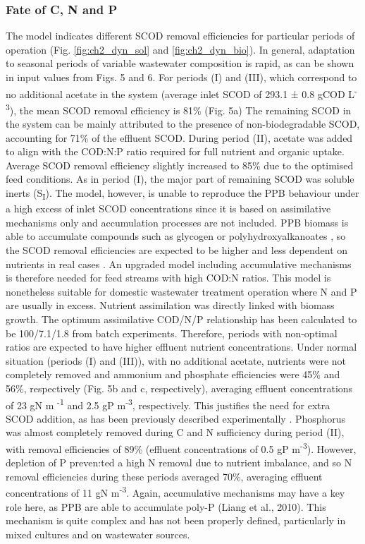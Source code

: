 \subsubsection{Fate of C, N and P}
The model indicates different SCOD removal efficiencies for particular periods of operation (Fig. \ref{fig:ch2_dyn_sol} and \ref{fig:ch2_dyn_bio}). In general, adaptation to seasonal periods of variable wastewater composition is rapid, as can be shown in input values from Figs. 5 and 6. For periods (I) and (III), which correspond to no additional acetate in the system (average inlet SCOD of 293.1 ± 0.8 gCOD L\textsuperscript{-3}), the mean SCOD removal efficiency is 81\% (Fig. 5a) The remaining SCOD in the system can be mainly attributed to the presence of non-biodegradable SCOD, accounting for 71\% of the effluent SCOD. During period (II), acetate was added to align with the COD:N:P ratio required for full nutrient and organic uptake. Average SCOD removal efficiency slightly increased to 85\% due to the optimised feed conditions. As in period (I), the major part of remaining SCOD was soluble inerts (S\textsubscript{I}). The model, however, is unable to reproduce the PPB behaviour under a high excess of inlet SCOD concentrations since it is based on assimilative mechanisms only and accumulation processes are not included. PPB biomass is able to accumulate compounds such as glycogen or polyhydroxyalkanoates \cite{melnicki2009}, so the SCOD removal efficiencies are expected to be higher and less dependent on nutrients in real cases \cite{hulsen2016,hulsen2016a}. An upgraded model including accumulative mechanisms is therefore needed for feed streams with high COD:N ratios. This model is nonetheless suitable for domestic wastewater treatment operation where N and P are usually in excess. 
\skippingparagraph
Nutrient assimilation was directly linked with biomass growth. The optimum assimilative COD/N/P relationship has been calculated to be 100/7.1/1.8 from batch experiments. Therefore, periods with non-optimal ratios are expected to have higher effluent nutrient concentrations. Under normal situation (periods (I) and (III)), with no additional acetate, nutrients were not completely removed and ammonium and phosphate efficiencies were 45\% and 56\%, respectively (Fig. 5b and c, respectively), averaging effluent concentrations of 23 gN m \textsuperscript{-1} and 2.5 gP m\textsuperscript{-3}, respectively. This justifies the need for extra SCOD addition, as has been previously described experimentally \cite{hulsen2016}. Phosphorus was almost completely removed during C and N sufficiency during period (II), with removal efficiencies of 89\% (effluent concentrations of 0.5 gP m\textsuperscript{-3}). However, depletion of P preven:ted a high N removal due to nutrient imbalance, and so N removal efficiencies during these periods averaged 70\%, averaging effluent concentrations of 11 gN m\textsuperscript{-3}. Again, accumulative mechanisms may have a key role here, as PPB are able to accumulate poly-P (Liang et al., 2010). This mechanism is quite complex and has not been properly defined, particularly in mixed cultures and on wastewater sources.

